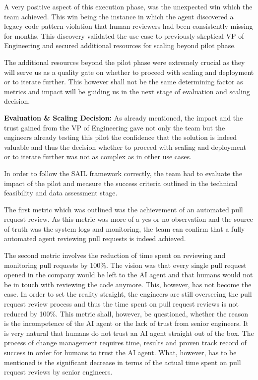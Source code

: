 \documentclass[]{imc-inf}
\begin{document}
	A very positive aspect of this execution phase, was the unexpected win which the team achieved. This win being the instance in which the agent discovered a legacy code pattern violation that human reviewers had been consistently missing for months. This discovery validated the use case to previously skeptical VP of Engineering and secured additional resources for scaling beyond pilot phase.

	The additional resources beyond the pilot phase were extremely crucial as they will serve us as a quality gate on whether to proceed with scaling and deployment or to iterate further. This however shall not be the same determining factor as metrics and impact will be guiding us in the next stage of evaluation and scaling decision.

\textbf{Evaluation \& Scaling Decision:}
	As already mentioned, the impact and the trust gained from the VP of Engineering gave not only the team but the engineers already testing this pilot the confidence that the solution is indeed valuable and thus the decision whether to proceed with scaling and deployment or to iterate further was not as complex as in other use cases.

	In order to follow the SAIL framework correctly, the team had to evaluate the impact of the pilot and measure the success criteria outlined in the technical feasibility and data assessment stage.
	
	The first metric which was outlined was the achievement of an automated pull request review. As this metric was more of a yes or no observation and the source of truth was the system logs and monitoring, the team can confirm that a fully automated agent reviewing pull requests is indeed achieved.

	The second metric involves the reduction of time spent on reviewing and monitoring pull requests by 100\%.
	The vision was that every single pull request opened in the company would be left to the AI agent and that humans would not be in touch with reviewing the code anymore. This, however, has not become the case. In order to set the reality straight, the engineers are still overseeing the pull request review process and thus the time spent on pull request reviews is not reduced by 100\%. This metric shall, however, be questioned, whether the reason is the incompetence of the AI agent or the lack of trust from senior engineers. It is very natural that humans do not trust an AI agent straight out of the box. The process of change management requires time, results and proven track record of success in order for humans to trust the AI agent. What, however, has to be mentioned is the significant decrease in terms of the actual time spent on pull request reviews by senior engineers. 
\end{document}
